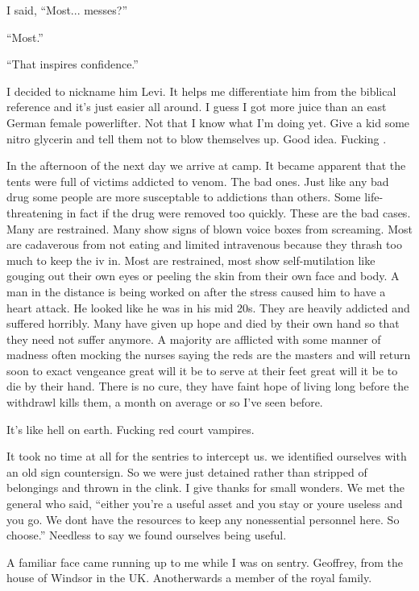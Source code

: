 I said, ``Most... messes?''

``Most.''

``That inspires confidence.''

I decided to nickname him Levi. It helps me differentiate him from the biblical reference and it's just easier all around. I guess I got more juice than an east German female powerlifter. Not that I know what I'm doing yet. Give a kid some nitro glycerin and tell them not to blow themselves up. Good idea. Fucking \chichenitza*.

\parasep

In the afternoon of the next day we arrive at camp. It became apparent that the tents were full of victims addicted to venom. The bad ones. Just like any bad drug some people are more susceptable to addictions than others. Some life-threatening in fact if the drug were removed too quickly. These are the bad cases. Many are restrained. Many show signs of blown voice boxes from screaming. Most are cadaverous from not eating and limited intravenous because they thrash too much to keep the iv in. Most are restrained, most show self-mutilation like gouging out their own eyes or peeling the skin from their own face and body. A man in the distance is being worked on after the stress caused him to have a heart attack. He looked like he was in his mid 20s. They are heavily addicted and suffered horribly. Many have given up hope and died by their own hand so that they need not suffer anymore. A majority are afflicted with some manner of madness often mocking the nurses saying the reds are the masters and will return soon to exact vengeance great will it be to serve at their feet great will it be to die by their hand. There is no cure, they have faint hope of living long before the withdrawl kills them, a month on average or so I've seen before. 

It's like hell on earth. Fucking red court vampires.

It took no time at all for the sentries to intercept us. we identified ourselves with an old sign countersign. So we were just detained rather than stripped of belongings and thrown in the clink. I give thanks for small wonders. We met the general who said, ``either you're a useful asset and you stay or youre useless and you go. We dont have the resources to keep any nonessential personnel here. So choose.'' Needless to say we found ourselves being useful.

\parasep

A familiar face came running up to me while I was on sentry. Geoffrey, from the house of Windsor in the UK. Anotherwards a member of the royal family.

